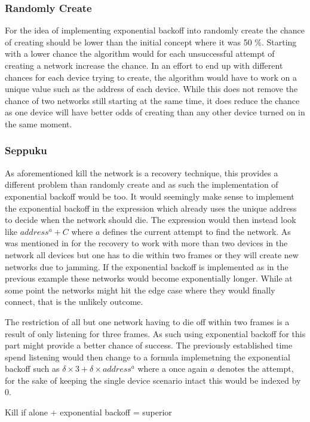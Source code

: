 \subsubsection*{Randomly Create}
For the idea of implementing exponential backoff into randomly create the chance of creating should be lower than the initial concept where it was 50 \%.
Starting with a lower chance the algorithm would for each unsuccessful attempt of creating a network increase the chance.
In an effort to end up with different chances for each device trying to create, the algorithm would have to work on a unique value such as the address of each device.
While this does not remove the chance of two networks still starting at the same time, it does reduce the chance as one device will have better odds of creating than any other device turned on in the same moment.
\subsubsection*{Seppuku}
As aforementioned kill the network is a recovery technique, this provides a different problem than randomly create and as such the implementation of exponential backoff would be too.
It would seemingly make sense to implement the exponential backoff in the expression which already uses the unique address to decide when the network should die.
The expression would then instead look like $address^a + C$ where $a$ defines the current attempt to find the network.
As was mentioned in  for the recovery to work with more than two devices in the network all devices but one has to die within two frames or they will create new networks due to jamming.
If the exponential backoff is implemented as in the previous example these networks would become exponentially longer.
While at some point the networks might hit the edge case where they would finally connect, that is the unlikely outcome.

\bigskip \noindent
The restriction of all but one network having to die off within two frames is a result of only listening for three frames.
As such using exponential backoff for this part might provide a better chance of success.
The previously established time spend listening would then change to a formula implemetning the exponential backoff such as $\delta \times 3 + \delta \times address^a$ where a once again $a$ denotes the attempt, for the sake of keeping the single device scenario intact this would be indexed by 0.

Kill if alone + exponential backoff = superior
